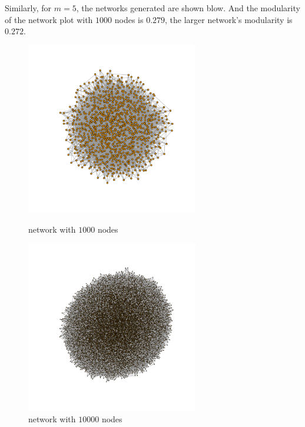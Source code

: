 \documentclass[draftcls,12pt,onecolumn]{IEEEtran}
\begin{document}
 Similarly, for $m = 5$, the networks generated are shown blow. And the modularity of the network plot with $1000$ nodes is $0.279$, the larger network's modularity is $0.272$.
\begin{figure}[htbp]
\centering
\begin{minipage}[t]{0.48\textwidth}
\centering
\includegraphics[width=7.5cm]{img/2_g_2_network}
\caption{network with $1000$ nodes}
\end{minipage}
\begin{minipage}[t]{0.48\textwidth}
\centering
\includegraphics[width=7.5cm]{img/2_g_2_network2}
\caption{network with $10000$ nodes}
\end{minipage}
\end{figure}
\end{document}
